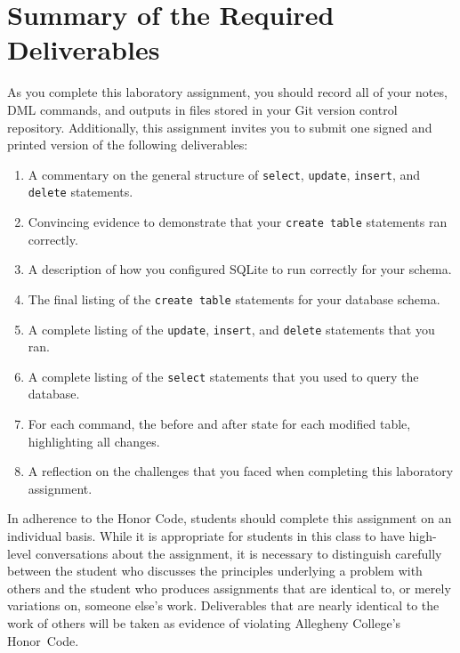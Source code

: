 \section*{Summary of the Required Deliverables}

As you complete this laboratory assignment, you should record all of your notes, DML commands, and outputs in files
stored in your Git version control repository.  Additionally, this assignment invites you to submit one signed and
printed version of the following deliverables:


\begin{enumerate}
    \setlength{\itemsep}{0pt}
  \item A commentary on the general structure of {\tt select}, {\tt update}, {\tt insert}, and {\tt delete} statements.
  \item Convincing evidence to demonstrate that your {\tt create table} statements ran correctly.
  \item A description of how you configured SQLite to run correctly for your schema.
  \item The final listing of the {\tt create table} statements for your database schema.
  \item A complete listing of the {\tt update}, {\tt insert}, and {\tt delete} statements that you ran.
  \item A complete listing of the {\tt select} statements that you used to query the database.
  \item For each command, the before and after state for each modified table, highlighting all changes.
  \item A reflection on the challenges that you faced when completing this laboratory assignment.
\end{enumerate}


In adherence to the Honor Code, students should complete this assignment on an individual basis. While it is appropriate
for students in this class to have high-level conversations about the assignment, it is necessary to distinguish
carefully between the student who discusses the principles underlying a problem with others and the student who produces
assignments that are identical to, or merely variations on, someone else's work.  Deliverables that are nearly identical
to the work of others will be taken as evidence of violating Allegheny College's \mbox{Honor Code}.



